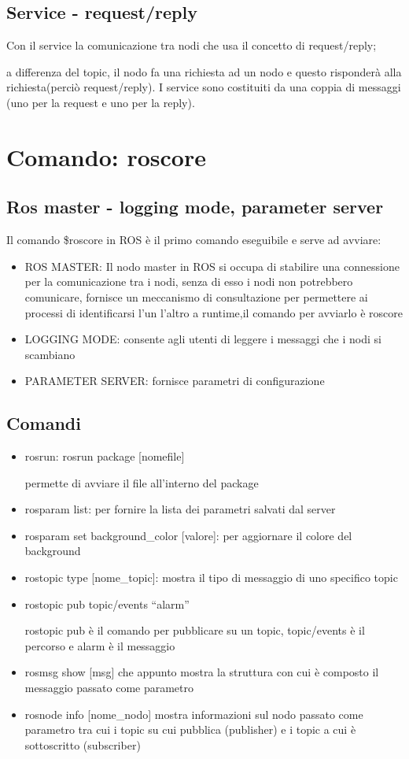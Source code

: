 \documentclass{report}
\begin{document}
\subsection{Service - request/reply}
Con il service la comunicazione tra nodi che usa il concetto di request/reply;

a differenza del topic, il nodo fa una richiesta ad un nodo e questo risponderà alla richiesta(perciò request/reply). I service sono costituiti da una coppia di messaggi (uno per la request e uno per la reply).
\section{Comando: roscore}
\subsection{Ros master - logging mode, parameter server}
Il comando \$roscore in ROS è il primo comando eseguibile e serve ad avviare:
\begin{itemize}
    \item ROS MASTER: Il nodo master in ROS si occupa di stabilire una connessione per la comunicazione tra i nodi, senza di esso i nodi non potrebbero comunicare,  fornisce un meccanismo di consultazione per permettere ai processi di identificarsi l’un l’altro a runtime,il comando per avviarlo è roscore
    \item LOGGING MODE: consente agli utenti di leggere i messaggi che i nodi si scambiano
    \item PARAMETER SERVER: fornisce parametri di configurazione
\end{itemize}



\subsection{Comandi}
\begin{itemize}
    \item rosrun: rosrun package [nomefile]
    
    permette di avviare il file all’interno del package
    \item rosparam list: per fornire la lista dei parametri salvati dal server 
\item rosparam set background\_color [valore]: per aggiornare il colore del background
\item rostopic type [nome\_topic]: mostra il tipo di messaggio di uno specifico topic
\item rostopic pub topic/events “alarm” 

rostopic pub è il comando per pubblicare su un topic, topic/events è il percorso e alarm è il messaggio
\item rosmsg show [msg] che appunto mostra la struttura con cui è composto il messaggio passato come parametro

    \item rosnode info [nome\_nodo] mostra informazioni sul nodo passato come parametro tra cui i topic su cui pubblica (publisher) e i topic a cui è sottoscritto (subscriber)

\end{itemize}
\end{document}
